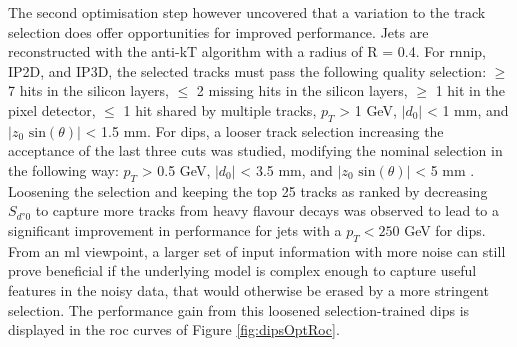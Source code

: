 The second optimisation step however uncovered that a variation to the track selection does offer opportunities for improved performance. Jets are reconstructed with the anti-kT algorithm with a radius of R = 0.4. For \gls{rnnip}, IP2D, and IP3D, the selected tracks must pass the following quality selection: $\geq$ 7 hits in the silicon layers, $\leq$ 2 missing hits in the silicon layers, $\geq$ 1 hit in the pixel detector, $\leq$ 1 hit shared by multiple tracks, $p_T$ > 1 GeV, $|d_0|$ < 1 mm, and $|z_0 \textrm{ sin}(\theta)|$ < 1.5 mm. For \gls{dips}, a looser track selection increasing the acceptance of the last three cuts was studied, modifying the nominal selection in the following way: $p_T$ > 0.5 GeV, $|d_0|$ < 3.5 mm, and $|z_0 \textrm{ sin}(\theta)|$ < 5 mm \cite{ATL-PHYS-PUB-2020-014}. Loosening the selection and keeping the top 25 tracks as ranked by decreasing $S_{d°0}$ to capture more tracks from heavy flavour decays was observed to lead to a significant improvement in performance for jets with a $p_T < 250$ GeV for \gls{dips}. From an \gls{ml} viewpoint, a larger set of input information with more noise can still prove beneficial if the underlying model is complex enough to capture useful features in the noisy data, that would otherwise be erased by a more stringent selection. The performance gain from this loosened selection-trained \gls{dips} is displayed in the \gls{roc} curves of Figure \ref{fig:dipsOptRoc}. \\


